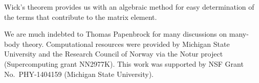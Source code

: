   Wick's theorem provides us with an algebraic method for easy
  determination of the terms that contribute to the matrix element.

  \begin{acknowledgement}
  We are much indebted to Thomas Papenbrock for many discussions on
  many-body theory.  Computational resources were provided by
  Michigan State University and the Research Council of Norway via the
  Notur project (Supercomputing grant NN2977K).  This work was
  supported by NSF Grant No.~PHY-1404159 (Michigan State University).
  \end{acknowledgement}



 




